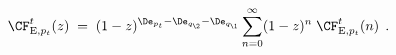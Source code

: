\begin{equation}
\CF_{{\rm E},p_t}^t(z)\;=\;(1-z)^{\De_{p_t}-\De_{q_\2}-\De_{q_\1}}
\sum_{n=0}^{\infty}(1-z)^{n}\;\CF_{{\rm E},p_t}^t(n)\;\,.
\end{equation}

